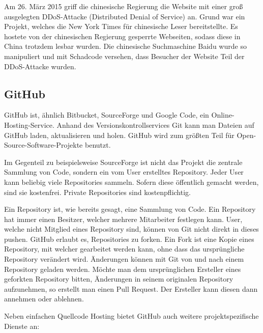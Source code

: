 Am 26. März 2015 griff die chinesische Regierung die Website mit einer groß ausgelegten DDoS-Attacke (Distributed Denial of Service) an. Grund war ein Projekt, welches die New York Times für chinesische Leser bereitstellte. Es hostete von der chinesischen Regierung gesperrte Webseiten, sodass diese in China trotzdem lesbar wurden. Die chinesische Suchmaschine Baidu wurde so manipuliert und mit Schadcode versehen, dass Besucher der Website Teil der DDoS-Attacke wurden.

\subsection{GitHub}
GitHub ist, ähnlich Bitbucket, SourceForge und Google Code, ein Online-Hosting-Service. Anhand des Versionskontrollservices Git kann man Dateien auf GitHub laden, aktualisieren und holen. GitHub wird zum größten Teil für Open-Source-Software-Projekte benutzt.

Im Gegenteil zu beispielsweise SourceForge ist nicht das Projekt die zentrale Sammlung von Code, sondern ein vom User erstelltes Repository. Jeder User kann beliebig viele Repositories sammeln. Sofern diese öffentlich gemacht werden, sind sie kostenfrei. Private Repositories sind kostenpflichtig.

Ein Repository ist, wie bereits gesagt, eine Sammlung von Code. Ein Repository hat immer einen Besitzer, welcher mehrere Mitarbeiter festlegen kann. User, welche nicht Mitglied eines Repository sind, können von Git nicht direkt in dieses pushen. GitHub erlaubt es, Repositories zu \glqq forken\grqq. Ein Fork ist eine Kopie eines Repository, mit welcher gearbeitet werden kann, ohne dass das ursprüngliche Repository verändert wird. Änderungen können mit Git von und nach einem Repository geladen werden. Möchte man dem ursprünglichen Ersteller eines geforkten Repository bitten, Änderungen in seinem originalen Repository aufzunehmen, so erstellt man einen Pull Request. Der Ersteller kann diesen dann annehmen oder ablehnen.

Neben einfachen Quellcode Hosting bietet GitHub auch weitere projektspezifische Dienste an:

